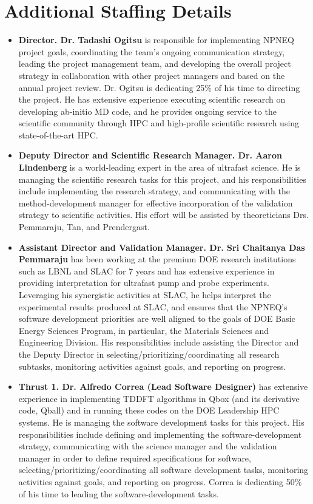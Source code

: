 \section{Additional Staffing Details}
\label{sec:appendixb}
\begin{itemize}
    \item[]{\bf Director. Dr. Tadashi Ogitsu} is responsible for implementing NPNEQ project goals, coordinating the team’s ongoing communication strategy, leading the project management team, and developing the overall project strategy in collaboration with other project managers and based on the annual project review. Dr. Ogitsu is dedicating 25\% of his time to directing the project. He has extensive experience executing scientific research on developing ab-initio MD code, and he provides ongoing service to the scientific community through HPC and high-profile scientific research using state-of-the-art HPC. 
    
    \item[]{\bf Deputy Director and Scientific Research Manager. Dr. Aaron Lindenberg} is a world-leading expert in the area of ultrafast science. He is managing the scientific research tasks for this project, and his responsibilities include implementing the research strategy, and communicating with the method-development manager for effective incorporation of the validation strategy to scientific activities. His effort will be assisted by theoreticians Drs. Pemmaraju, Tan, and Prendergast. 
    
    \item[]{\bf Assistant Director and Validation Manager. Dr. Sri Chaitanya Das Pemmaraju} has been working at the premium DOE research institutions such as LBNL and SLAC for 7 years and has extensive experience in providing interpretation for ultrafast pump and probe experiments. Leveraging his synergistic activities at SLAC, he helps interpret the experimental results produced at SLAC, and ensures that the NPNEQ’s software development priorities are well aligned to the goals of DOE Basic Energy Sciences Program, in particular, the Materials Sciences and Engineering Division. His responsibilities include assisting the Director and the Deputy Director in selecting/prioritizing/coordinating all research subtasks, monitoring activities against goals, and reporting on progress.
    
    \item[]{\bf Thrust 1. Dr. Alfredo Correa (Lead Software Designer)} has extensive experience in implementing TDDFT algorithms in Qbox (and its derivative code, Qball) and in running these codes on the DOE Leadership HPC systems. He is managing the software development tasks for this project. His responsibilities include defining and implementing the software-development strategy, communicating with the science manager and the validation manager in order to define required specifications for software, selecting/prioritizing/coordinating all software development tasks, monitoring activities against goals, and reporting on progress. Correa is dedicating 50\% of his time to leading the software-development tasks.
    

\end{itemize}
